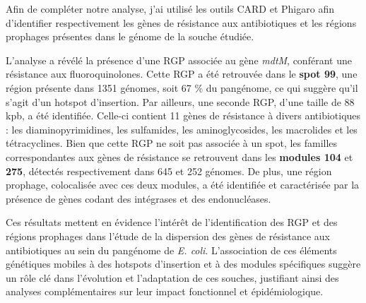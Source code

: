 Afin de compléter notre analyse, j'ai utilisé les outils CARD \cite{alcock_card_2023} et Phigaro \cite{starikova_phigaro_2020} afin d’identifier respectivement les gènes de résistance aux antibiotiques et les régions prophages présentes dans le génome de la souche étudiée.

L’analyse a révélé la présence d’une RGP associée au gène \textit{mdtM}, conférant une résistance aux fluoroquinolones. Cette RGP a été retrouvée dans le \textbf{spot 99}, une région présente dans 1351 génomes, soit 67 \% du pangénome, ce qui suggère qu’il s’agit d’un hotspot d’insertion. Par ailleurs, une seconde RGP, d’une taille de 88 kpb, a été identifiée. Celle-ci contient 11 gènes de résistance à divers antibiotiques : les diaminopyrimidines, les sulfamides, les aminoglycosides, les macrolides et les tétracyclines. Bien que cette RGP ne soit pas associée à un spot, les familles correspondantes aux gènes de résistance se retrouvent dans les \textbf{modules 104} et \textbf{275}, détectés respectivement dans 645 et 252 génomes. De plus, une région prophage, colocalisée avec ces deux modules, a été identifiée et caractérisée par la présence de gènes codant des intégrases et des endonucléases.

Ces résultats mettent en évidence l’intérêt de l'identification des RGP et des régions prophages dans l'étude de la dispersion des gènes de résistance aux antibiotiques au sein du pangénome de \textit{E. coli}. L’association de ces éléments génétiques mobiles à des hotspots d’insertion et à des modules spécifiques suggère un rôle clé dans l’évolution et l’adaptation de ces souches, justifiant ainsi des analyses complémentaires sur leur impact fonctionnel et épidémiologique.